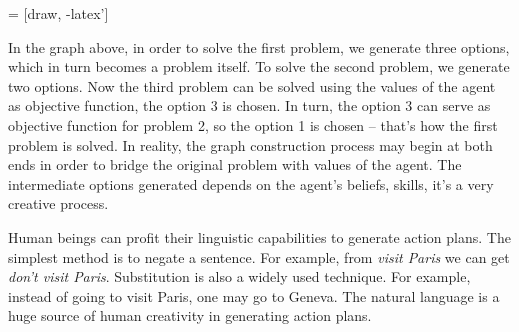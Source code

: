 \begin{center}
   = [draw, -latex']

\end{center}

In the graph above, in order to solve the first problem, we generate three options, which in turn becomes a problem itself. To solve the second problem, we generate two options. Now the third problem can be solved using the values of the agent as objective function, the option 3 is chosen. In turn, the option 3 can serve as objective function for problem 2, so the option 1 is chosen -- that's how the first problem is solved. In reality, the graph construction process may begin at both ends in order to bridge the original problem with values of the agent. The intermediate options generated depends on the agent's beliefs, skills, it's a very creative process.

Human beings can profit their linguistic capabilities to generate action plans. The simplest method is to negate a sentence. For example, from \emph{visit Paris} we can get \emph{don’t visit Paris}. Substitution is also a widely used technique. For example, instead of going to visit Paris, one may go to Geneva. The natural language is a huge source of human creativity in generating action plans.

